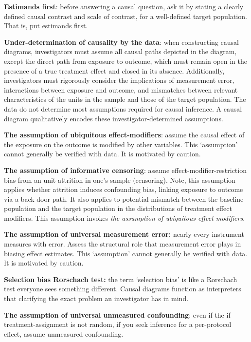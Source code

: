 \documentclass[
  singlecolumn]{article}
\begin{document}
\textbf{Estimands first}: before answering a causal question, ask it by
stating a clearly defined causal contrast and scale of contrast, for a
well-defined target population. That is, put estimands first.

\textbf{Under-determination of causality by the data}: when constructing
causal diagrams, investigators must assume all causal paths depicted in
the diagram, except the direct path from exposure to outcome, which must
remain open in the presence of a true treatment effect and closed in its
absence. Additionally, investigators must rigorously consider the
implications of measurement error, interactions between exposure and
outcome, and mismatches between relevant characteristics of the units in
the sample and those of the target population. The data do not determine
most assumptions required for causal inference. A causal diagram
qualitatively encodes these investigator-determined assumptions.

\textbf{The assumption of ubiquitous effect-modifiers}: assume the
causal effect of the exposure on the outcome is modified by other
variables. This `assumption' cannot generally be verified with data. It
is motivated by caution.

\textbf{The assumption of informative censoring}: assume
effect-modifier-restriction bias from an unit attrition in one's sample
(censoring). Note, this assumption applies whether attrition induces
confounding bias, linking exposure to outcome via a back-door path. It
also applies to potential mismatch between the baseline population and
the target population in the distributions of treatment effect
modifiers. This assumption invokes \emph{the assumption of ubiquitous
effect-modifiers}.

\textbf{The assumption of universal measurement error:} nearly every
instrument measures with error. Assess the structural role that
measurement error plays in biasing effect estimates. This `assumption'
cannot generally be verified with data. It is motivated by caution.

\textbf{Selection bias Rorschach test:} the term `selection bias' is
like a Rorschach test everyone sees something different. Causal diagrams
function as interpreters that clarifying the exact problem an
investigator has in mind.

\textbf{The assumption of universal unmeasured confounding}: even if the
if treatment-assignment is not random, if you seek inference for a
per-protocol effect, assume unmeasured confounding.
\end{document}
